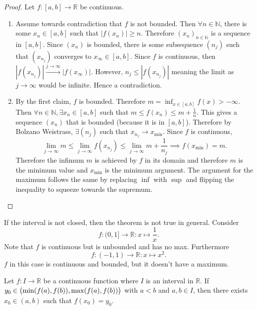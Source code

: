 \documentclass[../notes.tex]{subfiles}
\begin{document}
\begin{proof}
    Let $f : [a,b] \to \mathbb{R}$ be continuous.
    \begin{enumerate}
        \item Assume towards contradiction that $f$ is not bounded. Then $\forall n \in \mathbb{N}$, there is some $x_n \in [a,b]$ such that $|f(x_n)| \geq n$. Therefore $(x_n)_{n\in \mathbb{N}}$ is a sequence in $[a,b]$. Since $(x_n)$ is bounded, there is some subsequence $(n_j)$ such that $(x_{n_j})$ converges to $x_{\infty} \in [a,b]$. Since $f$ is continuous, then $|f(x_{n_j})| \xrightarrow{j \to \infty} |f(x_{\infty})|$. However, $n_j \leq |f(x_{n_{j}})|$ meaning the limit as $j \to \infty$ would be infinite. Hence a contradiction.
        \item
            By the first claim, $f$ is bounded. Therefore $m = \inf_{x \in [a,b]} f(x) > -\infty$. Then $\forall n \in \mathbb{N}, \exists x_n \in [a,b]$ such that $m \leq f(x_n) \leq m + \frac{1}{n}$. This gives a sequence $(x_n)$ that is bounded (because it is in $[a,b]$). Therefore by Bolzano Weistrass, $\exists (n_j)$ such that $x_{n_j} \to x_{\min}$. Since $f$ is continuous,
            \[
                \lim_{j\to \infty} m \leq \lim_{j\to \infty} f(x_{n_j}) \leq \lim_{j \to \infty} m + \frac{1}{n_j} \implies f(x_{\min}) = m
            .\]
            Therefore the infimum $m$ is achieved by $f$ in its domain and therefore $m$ is the minimum value and $x_{\min}$ is the minimum argument. The argument for the maximum follows the same by replacing $\inf$ with $\sup$ and flipping the inequality to squeeze towards the supremum.
    \end{enumerate}
\end{proof}

\begin{remark}
    If the interval is not closed, then the theorem is not true in general. Consider
    \[
        f : (0,1] \to \mathbb{R} : x \mapsto \frac{1}{x}
    .\]
    Note that $f$ is continuous but is unbounded and has no max. Furthermore
    \[
        f : (-1,1) \to \mathbb{R} : x \mapsto x^2
    .\]
    $f$ in this case is continuous and bounded, but it doesn't have a maximum.
\end{remark}

\begin{theorem}
    \label{thm:ivt}
    Let $f : I \to \mathbb{R}$ be a continuous function where $I$ is an interval in $\mathbb{R}$. If $y_0 \in \qty\big(\min(f(a),f(b)), \max(f(a), f(b)))$ with $a < b$ and $a,b \in I$, then there exists $x_0 \in (a,b)$ such that $f(x_0) = y_0$.
\end{theorem}
\end{document}
